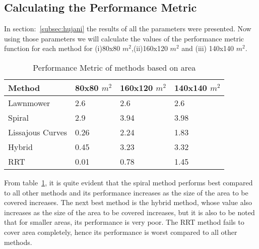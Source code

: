 \subsection{Calculating the Performance Metric}
In section:~\ref{subsec:hujani} the results of all the parameters were presented. Now using those parameters we will calculate the values of the performance metric function for each method for (i)80x80 $m^{2}$,(ii)160x120 $m^{2}$  and (iii) 140x140 $m^{2}$. \\
\begin{table}[htbp]
\centering
\caption{Performance Metric of methods based on area}
\label{tab:exc5qw6256}
\begin{tabular}{|l|l|l|l|}
																		\\ \hline
Method           & 80x80 $m^{2}$ & 160x120 $m^{2}$ & 140x140 $m^{2}$		 \\ \hline
Lawnmower        & 2.6             & 2.6         & 2.6                       \\ \hline
Spiral           & 2.9             & 3.94        & 3.98                       \\ \hline
Lissajous Curves & 0.26            & 2.24         & 1.83                        \\ \hline
Hybrid           & 0.45             & 3.23        & 3.32                       \\ \hline
RRT              & 0.01             & 0.78        & 1.45                      \\ \hline
\end{tabular}
\end{table}

From table~\ref{tab:exc5qw6256}, it is quite evident that the spiral method performs best compared to all other methods and its performance increases as the size of the area to be covered increases. The next best method is the hybrid method, whose value also increases as the size of the area to be covered increases, but it is also to be noted that for smaller areas, its performance is very poor.
The RRT method fails to cover area completely, hence its performance is worst compared to all other methods. 